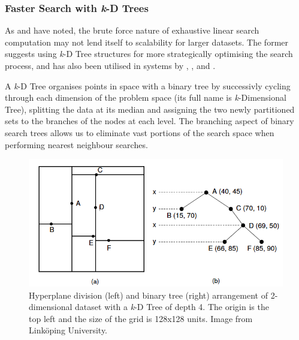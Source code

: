 {{{{{{{\subsubsection{Faster Search with \textit{k}-D Trees}

As \cite{Collins2007} and \cite{Dannenberg2006} have noted, the brute force nature of exhaustive linear search computation may not lend itself to scalability for larger datasets. The former suggests using \textit{k}-D Tree structures for more strategically optimising the search process, and has also been utilised in systems by \cite{Schwarz2009}, \cite{Einbond2010}, \cite{Stoll2013} and \cite{Klugel2014}.

A \textit{k}-D Tree organises points in space with a binary tree by successivly cycling through each dimension of the problem space (its full name is \textit{k}-Dimensional Tree), splitting the data at its median and assigning the two newly partitioned sets to the branches of the nodes at each level. The branching aspect of binary search trees allows us to eliminate vast portions of the search space when performing nearest neighbour searches. 

\begin{figure}
	\begin{center}
		\includegraphics[width=1.0\textwidth]{ch05_pyconcat/figures/kdTree.png}
	\end{center}
	\caption[\textit{k}-D Tree illustration.]{Hyperplane division (left) and binary tree (right) arrangement of 2-dimensional dataset with a \textit{k}-D Tree of depth 4. The origin is the top left and the size of the grid is 128x128 units. Image from Linköping University\protect\footnotemark.}
	\label{fig:markov_unit}
\end{figure}


}}}}}}}
